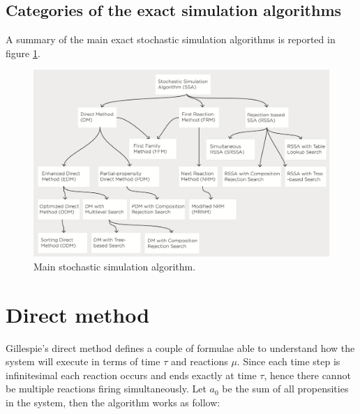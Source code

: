   \subsection{Categories of the exact simulation algorithms}
  A summary of the main exact stochastic simulation algorithms is reported in figure \ref{fig:tree}.

  \begin{figure}[H]
    \centering
    \includegraphics[width=\textwidth]{tree_methods.png}
    \caption{Main stochastic simulation algorithm.}
    \label{fig:tree}
  \end{figure}

\section{Direct method}
Gillespie's direct method defines a couple of formulae able to understand how the system will execute in terms of time $\tau$ and reactions $\mu$.
Since each time step is infinitesimal each reaction occurs and ends exactly at time $\tau$, hence there cannot be multiple reactions firing simultaneously.
Let $a_0$ be the sum of all propensities in the system, then the algorithm works as follow:

